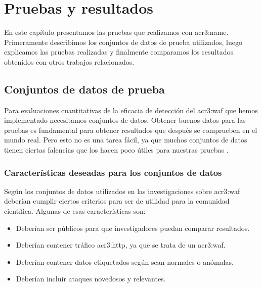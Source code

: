 \renewcommand{\newCommandChapterTitle}{Pruebas y resultados}
\chapter{\newCommandChapterTitle}
\markright{\hfill \thechapter. \newCommandChapterTitle}
\label{chap:p3_results}


En este capítulo presentamos las pruebas que realizamos con \gls{acr3:name}.
Primeramente describimos los conjuntos de datos de prueba utilizados,
luego explicamos las pruebas realizadas y finalmente comparamos los
resultados obtenidos con otros trabajos relacionados.


\section{Conjuntos de datos de prueba}

Para evaluaciones cuantitativas de la eficacia de detección del
\gls{acr3:waf} que hemos implementado necesitamos conjuntos de datos.
Obtener buenos datos para las pruebas es fundamental para obtener
resultados que después se comprueben en el mundo real.
Pero esto no es una tarea fácil, ya que muchos conjuntos de datos tienen
ciertas falencias que los hacen poco útiles para nuestras pruebas
\citep{torranoGimenez2015study}.

\subsection{Características deseadas para los conjuntos de datos}

Según \citep{torranoGimenez2015study} los conjuntos de
datos utilizados en las investigaciones sobre \gls{acr3:waf} deberían
cumplir ciertos criterios para ser de utilidad para la comunidad
científica. Algunas de esas características son:

\begin{itemize}
    \item
    Deberían ser públicos para que investigadores puedan comparar
    resultados.

    \item
    Deberían contener tráfico \gls{acr3:http}, ya que se trata de un
    \gls{acr3:waf}.

    \item
    Deberían contener datos etiquetados según sean normales o anómalas.

    \item
    Deberían incluir ataques novedosos y relevantes.
\end{itemize}

